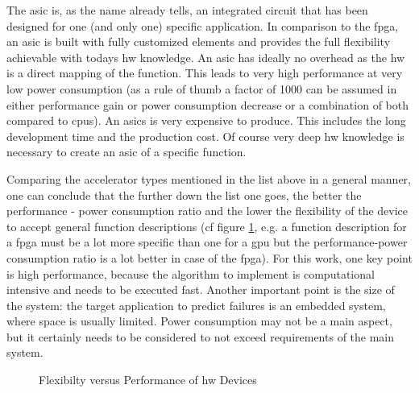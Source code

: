 \documentclass[mscthesis]{usiinfthesis}
\begin{document}
\begin{description}
        The \acrfull{asic} is, as the name already tells, an integrated circuit
        that has been designed for one (and only one) specific application. In
        comparison to the \gls{fpga}, an \gls{asic} is built with fully
        customized elements and provides the full flexibility achievable with
        todays \gls{hw} knowledge. An \gls{asic} has ideally no overhead as the
        \gls{hw} is a direct mapping of the function. This leads to very high
        performance at very low power consumption (as a rule of thumb a factor
        of 1000 can be assumed in either performance gain or power consumption
        decrease or a combination of both compared to \glspl{cpu}).  An
        \glspl{asic} is very expensive to produce. This includes the long
        development time and the production cost. Of course very deep \gls{hw}
        knowledge is necessary to create an \gls{asic} of a specific function.
\end{description}

Comparing the accelerator types mentioned in the list above in a general
manner, one can conclude that the further down the list one goes, the better
the performance - power consumption ratio and the lower the flexibility of the
device to accept general function descriptions (cf figure \ref{fig:hw}, e.g.
a function description for a \gls{fpga} must be a lot more specific than one
for a \gls{gpu} but the performance-power consumption ratio is a lot better in
case of the \gls{fpga}). For this work, one key point is high performance,
because the algorithm to implement is computational intensive and needs to be
executed fast.  Another important point is the size of the system: the target
application to predict failures is an embedded system, where space is usually
limited. Power consumption may not be a main aspect, but it certainly needs to
be considered to not exceed requirements of the main system.

\begin{figure}
    \centering
    
    \caption{Flexibilty versus Performance of \acrshort{hw} Devices}
    \label{fig:hw}
\end{figure}
\end{document}

